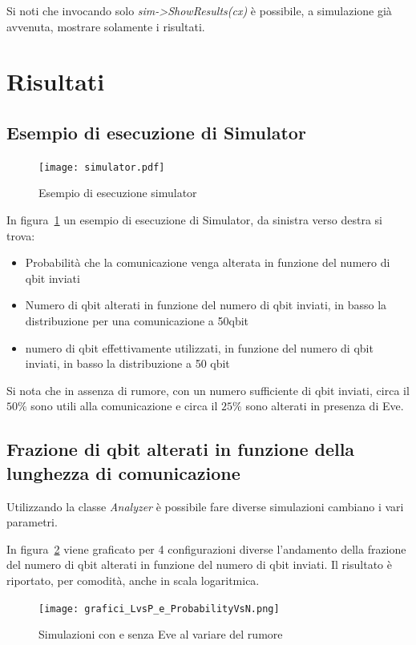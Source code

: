 \documentclass[11 pt, a4paper]{article}
\begin{document}
Si noti che invocando solo \textit{sim->ShowResults(cx)} è possibile, a simulazione già avvenuta, mostrare solamente i risultati.

\clearpage
\section{Risultati}
\subsection{Esempio di esecuzione di Simulator}

\begin{figure}[htb!]
\centering
\texttt{[image: simulator.pdf]}
\caption{Esempio di esecuzione simulator}
\label{fig:simulator}
\end{figure}

In figura~\ref{fig:simulator} un esempio di esecuzione di Simulator, da sinistra verso destra si trova:
\begin{itemize}
\item Probabilità che la comunicazione venga alterata in funzione del numero di qbit inviati
\item Numero di qbit alterati in funzione del numero di qbit inviati, in basso la distribuzione per una comunicazione a 50qbit
\item numero di qbit effettivamente utilizzati, in funzione del numero di qbit inviati, in basso la distribuzione a 50 qbit
\end{itemize}

Si nota che in assenza di rumore, con un numero sufficiente di qbit inviati, circa il $50\%$ sono utili alla comunicazione e circa il $25\%$ sono alterati in presenza di Eve.

\clearpage
\subsection{Frazione di qbit alterati in funzione della lunghezza di comunicazione}
Utilizzando la classe \textit{Analyzer} è possibile fare diverse simulazioni cambiano i vari parametri.

In figura~\ref{fig:grafici_LvsP_e_ProbabilityVsN} viene graficato per 4 configurazioni diverse l'andamento della frazione del numero di qbit alterati in funzione del numero di qbit inviati. Il risultato è riportato, per comodità, anche in scala logaritmica.
\begin{figure}[htb!]
\centering
\texttt{[image: grafici\_LvsP\_e\_ProbabilityVsN.png]}
\caption{Simulazioni con e senza Eve al variare del rumore}
\label{fig:grafici_LvsP_e_ProbabilityVsN}
\end{figure}
\end{document}
